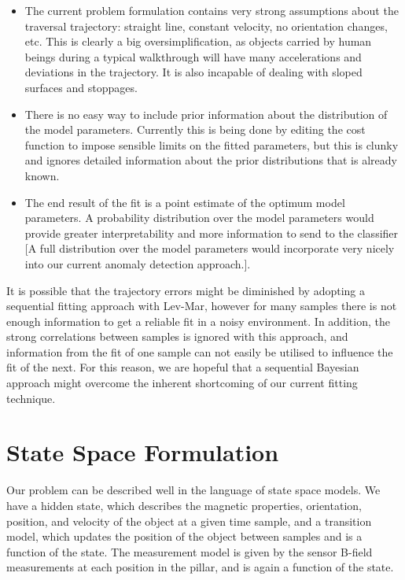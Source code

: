 \documentclass[10pt, a4paper, twocolumn]{article} %
\begin{document}
\begin{itemize}
	\item The current problem formulation contains very strong assumptions about the traversal trajectory: straight line, constant velocity, no orientation changes, etc. This is clearly a big oversimplification, as objects carried by human beings during a typical walkthrough will have many accelerations and deviations in the trajectory. It is also incapable of dealing with sloped surfaces and stoppages.
	
	\item There is no easy way to include prior information about the distribution of the model parameters. Currently this is being done by editing the cost function to impose sensible limits on the fitted parameters, but this is clunky and ignores detailed information about the  prior distributions that is already known.
	
	\item The end result of the fit is a point estimate of the optimum model parameters. A probability distribution over the model parameters would provide greater interpretability and more information to send to the classifier [A full distribution over the model parameters would incorporate very nicely into our current anomaly detection approach.].
\end{itemize}

It is possible that the trajectory errors might be diminished by adopting a sequential fitting approach with Lev-Mar, however for many samples there is not enough information to get a reliable fit in a noisy environment. In addition, the strong correlations between samples is ignored with this approach, and information from the fit of one sample can not easily be utilised to influence the fit of the next. For this reason, we are hopeful that a sequential Bayesian approach might overcome the inherent shortcoming of our current fitting technique.

\section{State Space Formulation}
\label{State_space}

Our problem can be described well in the language of state space models. We have a hidden state, which describes the magnetic properties, orientation, position, and velocity of the object at a given time sample, and a transition model, which updates the position of the object between samples and is a function of the state. The measurement model is given by the sensor B-field measurements at each position in the pillar, and is again a function of the state.
\end{document}
